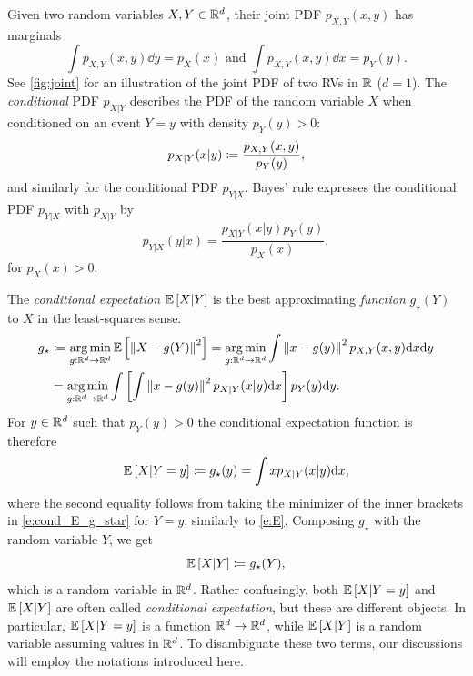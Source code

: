 \documentclass{fairmeta}
\numberwithin{equation}{section}
\begin{document}
Given two random variables $X,Y\in \mathbb R^d$, their joint PDF $p_{X,Y}(x,y)$ has marginals 
\begin{equation}\label{e:marginals}
 \int p_{X,Y}(x,y)\dd y = p_X(x) \text{ and } \int p_{X,Y}(x,y)\dd x = p_Y(y). 
\end{equation}
See \cref{fig:joint} for an illustration of the joint PDF of two RVs in $\mathbb R$ ($d=1$). 
The \emph{conditional} PDF $p_{X|Y}$ describes the PDF of the random variable $X$ when conditioned on an event $Y=y$ with density $p_Y(y)>0$:
\begin{equation}\label{e:conditional}
    p_{X|Y}(x|y)\coloneqq\frac{p_{X,Y}(x,y)}{p_Y(y)},
\end{equation} 
and similarly for the conditional PDF $p_{Y|X}$. Bayes' rule expresses the conditional PDF $p_{Y|X}$ with $p_{X|Y}$ by
\begin{equation}
    p_{Y|X}(y|x) = \frac{p_{X|Y}(x|y)p_Y(y)}{p_X(x)},
\end{equation}
for $p_X(x)>0$. 

The \emph{conditional expectation} $\mathbb{E}\left [X | Y\right ]$ is the best approximating \emph{function} $g_\star(Y)$ to $X$ in the least-squares sense: 
\begin{align}\nonumber
    g_\star &\coloneqq  \operatorname*{arg\,min}_{g:\mathbb R^d\rightarrow\mathbb R^d}\mathbb{E}\left [\left\Vert X-g(Y)\right\Vert^2\right ] =  \operatorname*{arg\,min}_{g:\mathbb R^d\rightarrow\mathbb R^d}\int \left\Vert x-g(y)\right\Vert^2 p_{X,Y}(x,y)\mathrm{d} x \mathrm{d} y \\ \label{e:cond_E_g_star}
    &= \operatorname*{arg\,min}_{g:\mathbb R^d\rightarrow\mathbb R^d} \int\left [\textcolor{black}{\int \left\Vert x-g(y)\right\Vert^2p_{X|Y}(x|y)\mathrm{d} x}\right ] p_Y(y)\mathrm{d} y.
\end{align}
For $y\in \mathbb R^d$ such that $p_Y(y)>0$ the conditional expectation function is therefore
\begin{equation}\label{e:cond_E_func}
    \E\brac{X|Y=y} \defe g_\star(y) = \int x p_{X|Y}(x|y) \dd x, %
\end{equation}
where the second equality follows from taking the minimizer of the inner brackets in \cref{e:cond_E_g_star} for $Y=y$, similarly to \cref{e:E}. 
Composing $g_\star$ with the random variable $Y$, we get 
\begin{equation}
    \E\brac{X|Y} \defe g_\star(Y), %
\end{equation}
which is a random variable in $\mathbb R^d$.
Rather confusingly, both $\mathbb{E}\left [X|Y=y\right ]$ and $\mathbb{E}\left [X|Y\right ]$ are often called \emph{conditional expectation}, but these are different objects.
In particular, $\mathbb{E}\left [X|Y=y\right ]$ is a function $\mathbb R^d\rightarrow\mathbb R^d$, while $\mathbb{E}\left [X|Y\right ]$ is a random variable assuming values in $\mathbb R^d$.
To disambiguate these two terms, our discussions will employ the notations introduced here. 
\end{document}
